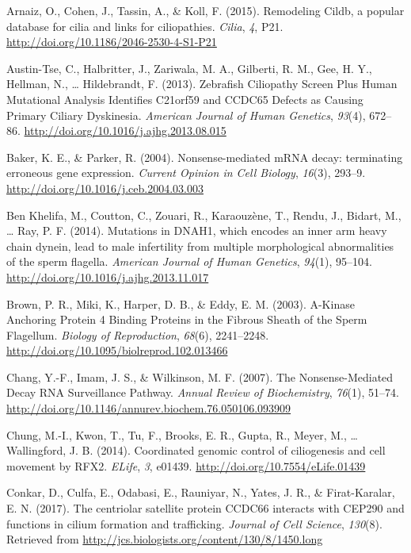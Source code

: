 \documentclass[12pt,twoside]{reedthesis}
\theoremstyle{definition}
\theoremstyle{definition}
\theoremstyle{remark}
\begin{document}
  \hypertarget{ref-Arnaiz2015}{}
  Arnaiz, O., Cohen, J., Tassin, A., \& Koll, F. (2015). Remodeling Cildb,
  a popular database for cilia and links for ciliopathies. \emph{Cilia},
  \emph{4}, P21. \url{http://doi.org/10.1186/2046-2530-4-S1-P21}
  
  \hypertarget{ref-Austin-Tse2013}{}
  Austin-Tse, C., Halbritter, J., Zariwala, M. A., Gilberti, R. M., Gee,
  H. Y., Hellman, N., \ldots{} Hildebrandt, F. (2013). Zebrafish
  Ciliopathy Screen Plus Human Mutational Analysis Identifies C21orf59 and
  CCDC65 Defects as Causing Primary Ciliary Dyskinesia. \emph{American
  Journal of Human Genetics}, \emph{93}(4), 672--86.
  \url{http://doi.org/10.1016/j.ajhg.2013.08.015}
  
  \hypertarget{ref-Baker2004}{}
  Baker, K. E., \& Parker, R. (2004). Nonsense-mediated mRNA decay:
  terminating erroneous gene expression. \emph{Current Opinion in Cell
  Biology}, \emph{16}(3), 293--9.
  \url{http://doi.org/10.1016/j.ceb.2004.03.003}
  
  \hypertarget{ref-BenKhelifa2014}{}
  Ben Khelifa, M., Coutton, C., Zouari, R., Karaouzène, T., Rendu, J.,
  Bidart, M., \ldots{} Ray, P. F. (2014). Mutations in DNAH1, which
  encodes an inner arm heavy chain dynein, lead to male infertility from
  multiple morphological abnormalities of the sperm flagella.
  \emph{American Journal of Human Genetics}, \emph{94}(1), 95--104.
  \url{http://doi.org/10.1016/j.ajhg.2013.11.017}
  
  \hypertarget{ref-Brown2003}{}
  Brown, P. R., Miki, K., Harper, D. B., \& Eddy, E. M. (2003). A-Kinase
  Anchoring Protein 4 Binding Proteins in the Fibrous Sheath of the Sperm
  Flagellum. \emph{Biology of Reproduction}, \emph{68}(6), 2241--2248.
  \url{http://doi.org/10.1095/biolreprod.102.013466}
  
  \hypertarget{ref-Chang2007}{}
  Chang, Y.-F., Imam, J. S., \& Wilkinson, M. F. (2007). The
  Nonsense-Mediated Decay RNA Surveillance Pathway. \emph{Annual Review of
  Biochemistry}, \emph{76}(1), 51--74.
  \url{http://doi.org/10.1146/annurev.biochem.76.050106.093909}
  
  \hypertarget{ref-Chung2014}{}
  Chung, M.-I., Kwon, T., Tu, F., Brooks, E. R., Gupta, R., Meyer, M.,
  \ldots{} Wallingford, J. B. (2014). Coordinated genomic control of
  ciliogenesis and cell movement by RFX2. \emph{ELife}, \emph{3}, e01439.
  \url{http://doi.org/10.7554/eLife.01439}
  
  \hypertarget{ref-Conkar2017}{}
  Conkar, D., Culfa, E., Odabasi, E., Rauniyar, N., Yates, J. R., \&
  Firat-Karalar, E. N. (2017). The centriolar satellite protein CCDC66
  interacts with CEP290 and functions in cilium formation and trafficking.
  \emph{Journal of Cell Science}, \emph{130}(8). Retrieved from
  \url{http://jcs.biologists.org/content/130/8/1450.long}
  
\end{document}
